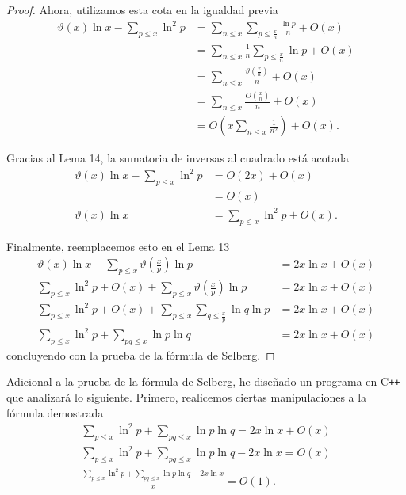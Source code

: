 \documentclass{article}
\theoremstyle{definition}
\theoremstyle{remark}
\begin{document}
\begin{proof}
Ahora, utilizamos esta cota en la igualdad previa
\begin{align*}
\vartheta(x)\ln x - \sum_{p \leq x} \ln^2 p &= \sum_{n \leq x} \sum_{p \leq \frac{x}{n}} \frac{\ln p}{n} + O(x) \\
&= \sum_{n \leq x} \frac{1}{n}\sum_{p \leq \frac{x}{n}} \ln p + O(x) \\
&= \sum_{n \leq x} \frac{\vartheta\left(\frac{x}{n}\right)}{n} + O(x) \\
&= \sum_{n \leq x} \frac{O\left(\frac{x}{n}\right)}{n} + O(x) \\
&= O\left(x \sum_{n \leq x} \frac{1}{n^2}\right) + O(x).
\end{align*}

Gracias al Lema 14, la sumatoria de inversas al cuadrado est\'a acotada
\begin{align*}
\vartheta(x)\ln x - \sum_{p \leq x} \ln^2 p &= O(2x) + O(x) \\
&= O(x)\\
\vartheta(x)\ln x &= \sum_{p \leq x} \ln^2 p + O(x).
\end{align*}

Finalmente, reemplacemos esto en el Lema 13
\begin{align*}
\vartheta(x)\ln x + \sum_{p \leq x} \vartheta\left(\frac{x}{p}\right)\ln p &= 2x\ln x + O(x) \\
\sum_{p \leq x} \ln^2 p + O(x) + \sum_{p \leq x} \vartheta\left(\frac{x}{p}\right)\ln p &= 2x\ln x + O(x) \\
\sum_{p \leq x} \ln^2 p + O(x) + \sum_{p \leq x} \sum_{q \leq \frac{x}{p}} \ln q \ln p &= 2x\ln x + O(x) \\
\sum_{p \leq x} \ln^2 p + \sum_{pq \leq x} \ln p \ln q &= 2x\ln x + O(x)
\end{align*}
concluyendo con la prueba de la f\'ormula de Selberg.
\end{proof}

\newpage

Adicional a la prueba de la f\'ormula de Selberg, he dise\~nado un programa en C\texttt{++}
que analizar\'a lo siguiente. Primero, realicemos ciertas manipulaciones a la f\'ormula demostrada
\begin{gather*}
\sum_{p \leq x} \ln^2 p + \sum_{pq \leq x} \ln p \ln q = 2x\ln x + O(x) \\
\sum_{p \leq x} \ln^2 p + \sum_{pq \leq x} \ln p \ln q - 2x\ln x = O(x) \\
\frac{\sum_{p \leq x} \ln^2 p + \sum_{pq \leq x} \ln p \ln q - 2x\ln x}{x} = O(1).
\end{gather*}
\end{document}
